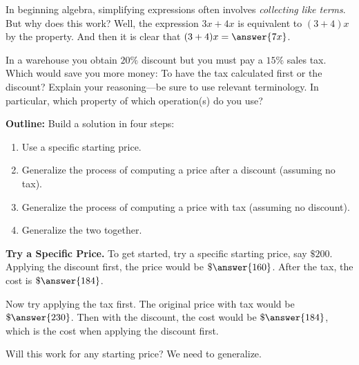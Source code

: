 \documentclass[nooutcomes]{ximera}
\begin{document}
\begin{problem}
In beginning algebra, simplifying expressions often involves \textit{collecting like terms}.  But why does this work?  Well, the expression $3x+4x$ is equivalent to $(3+4)x$ by the  property.  And then it is clear that $(3+4)x = \answer{7x}$. 
\end{problem}

\begin{problem}In a warehouse you obtain $20\%$ discount but you must pay a
  $15\%$ sales tax. Which would save you more money: To have the tax
  calculated first or the discount? Explain your reasoning---be sure
  to use relevant terminology.  In particular, which property 
of which operation(s) do you use?  

\textbf{Outline:}  Build a solution in four steps: 
\begin{enumerate}
\item Use a specific starting price. 
\item Generalize the process of computing a price after a discount (assuming no tax).  
\item Generalize the process of computing a price with tax (assuming no discount). 
\item Generalize the two together. 
\end{enumerate}
\textbf{Try a Specific Price.}
To get started, try a specific starting price, say $\$200$.  Applying the discount first, the price would be $\$\answer{160}$.  After the tax, the cost is $\$\answer{184}$.  

Now try applying the tax first.  The original price with tax would be $\$\answer{230}$.  Then with the discount, the cost would be $\$\answer{184}$, which is  the cost when applying the discount first.  

Will this work for any starting price?  We need to generalize.  


\end{problem}
\end{document}
